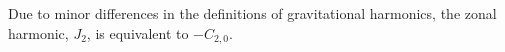 Due to minor differences in the definitions of gravitational harmonics, the zonal harmonic, $J_2$, is equivalent to $-C_{2,0}$.

